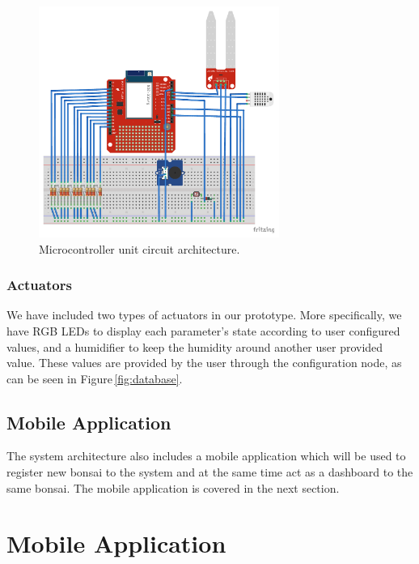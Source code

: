 \documentclass{article}
\begin{document}
\begin{figure}[!ht]
    \centering
    \includegraphics[width=0.7\textwidth]{figures/bmon_arch}
    \caption{Microcontroller unit circuit architecture.}
    \label{fig:architecture}
\end{figure}

\subsubsection{Actuators}
We have included two types of actuators in our prototype. More specifically, we
have RGB LEDs to display each parameter's state according to user configured
values, and a humidifier to keep the humidity around another user provided
value. These values are provided by the user through the configuration node, as
can be seen in Figure\,\ref{fig:database}.



\subsection{Mobile Application}
The system architecture also includes a mobile application which will be used to
register new bonsai to the system and at the same time act as a dashboard to the
same bonsai. The mobile application is covered in the next section.

\section{Mobile Application}\label{sec:mobile}
\end{document}
